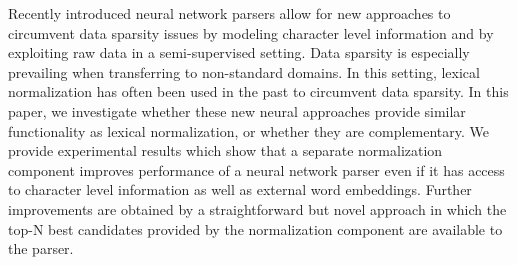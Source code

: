 Recently introduced neural network parsers allow for new approaches to circumvent data sparsity issues by modeling character level information and by exploiting raw data in a semi-supervised setting. Data sparsity is especially prevailing when transferring to non-standard domains. In this setting,  lexical normalization has often been used in the past to circumvent data sparsity. In this paper, we investigate whether these new neural approaches provide similar functionality as lexical normalization, or whether they are complementary. We provide experimental results which show that a separate normalization component improves performance of a neural network parser even if it has access to character level information as well as external word embeddings. Further improvements are obtained by a straightforward but novel approach in which the top-N best candidates provided by the normalization component are available to the parser.
